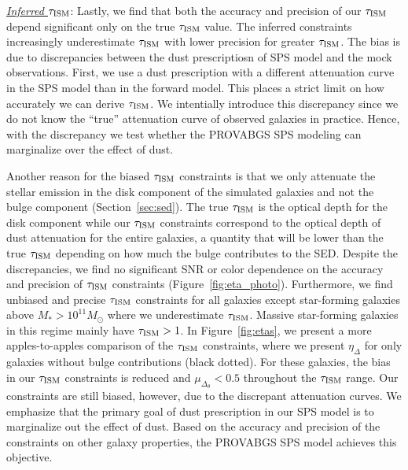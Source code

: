 \noindent \underline{\emph{Inferred $\tau_{\rm ISM}$}}:  
Lastly, we find that both the accuracy and precision of our $\tau_{\rm ISM}$ depend
significant only on the true $\tau_{\rm ISM}$ value. 
The inferred constraints increasingly underestimate $\tau_{\rm ISM}$ with lower
precision for greater $\tau_{\rm ISM}$.
The bias is due to discrepancies between the dust prescriptiosn of SPS model
and the mock observations. 
First, we use a dust prescription with a different attenuation curve in the SPS
model than in the forward model. 
This places a strict limit on how accurately we can derive $\tau_{\rm ISM}$.
We intentially introduce this discrepancy since we do not know the ``true''
attenuation curve of observed galaxies in practice. 
Hence, with the discrepancy we test whether the {\sc PROVABGS} SPS modeling can
marginalize over the effect of dust.

Another reason for the biased $\tau_{\rm ISM}$ constraints is that we only attenuate
the stellar emission in the disk component of the simulated galaxies and not
the bulge component (Section~\ref{sec:sed}).
The true $\tau_{\rm ISM}$ is the optical depth for the disk component while our
$\tau_{\rm ISM}$ constraints correspond to the optical depth of dust attenuation
for the entire galaxies, a quantity that will be lower than the true $\tau_{\rm ISM}$
depending on how much the bulge contributes to the SED. 
Despite the discrepancies, we find no significant SNR or color dependence on
the accuracy and precision of $\tau_{\rm ISM}$ constraints
(Figure~\ref{fig:eta_photo}). 
Furthermore, we find unbiased and precise $\tau_{\rm ISM}$ constraints for all galaxies
except star-forming galaxies above $M_* > 10^{11}M_\odot$ where we underestimate 
$\tau_{\rm ISM}$. 
Massive star-forming galaxies in this regime mainly have $\tau_{\rm ISM} > 1$.
In Figure~\ref{fig:etas}, we present a more apples-to-apples comparison of the
$\tau_{\rm ISM}$ constraints, where we present $\eta_\Delta$ for only galaxies without
bulge contributions (black dotted). 
For these galaxies, the bias in our $\tau_{\rm ISM}$ constraints is reduced and
$\mu_{\Delta_\theta}<0.5$ throughout the $\tau_{\rm ISM}$ range. 
Our constraints are still biased, however, due to the discrepant attenuation
curves. 
We emphasize that the primary goal of dust prescription in our SPS model is to
marginalize out the effect of dust. 
Based on the accuracy and precision of the constraints on other galaxy
properties, the {\sc PROVABGS} SPS model achieves this objective.  



